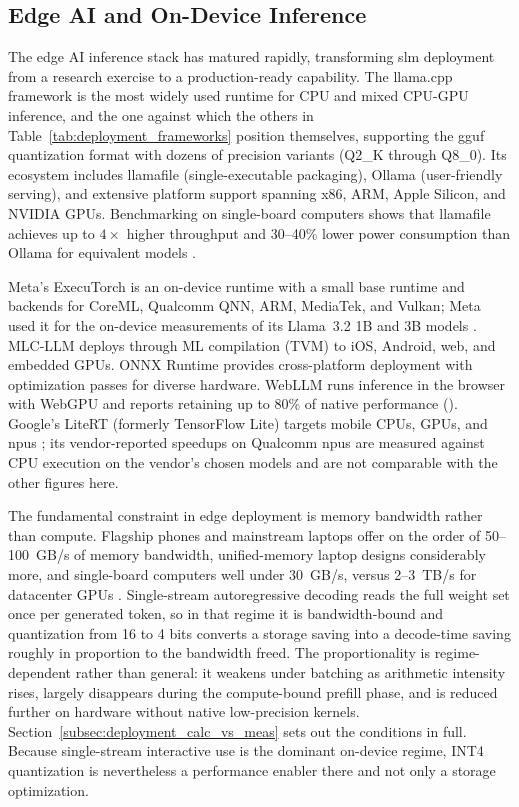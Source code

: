 \subsection{Edge AI and On-Device Inference}
\label{subsec:background_edge_ai}
The edge AI inference stack has matured rapidly, transforming \gls{slm} deployment from a research exercise to a production-ready capability. The llama.cpp framework \citep{gerganov2023llamacpp} is the most widely used runtime for CPU and mixed CPU-GPU inference, and the one against which the others in Table~\ref{tab:deployment_frameworks} position themselves, supporting the \gls{gguf} quantization format with dozens of precision variants (Q2\_K through Q8\_0). Its ecosystem includes llamafile (single-executable packaging), Ollama (user-friendly serving), and extensive platform support spanning x86, ARM, Apple Silicon, and NVIDIA GPUs. Benchmarking on single-board computers shows that llamafile achieves up to $4\times$ higher throughput and 30--40\% lower power consumption than Ollama for equivalent models \citep{nguyen2025sbc}.

Meta's ExecuTorch \citep{meta2024executorch} is an on-device runtime with a small base runtime and backends for CoreML, Qualcomm QNN, ARM, MediaTek, and Vulkan; Meta used it for the on-device measurements of its Llama~3.2 1B and 3B models \citep{meta2024llama32card}. MLC-LLM \citep{mlc2024} deploys through ML compilation (TVM) to iOS, Android, web, and embedded GPUs. ONNX Runtime \citep{microsoft2019onnx} provides cross-platform deployment with optimization passes for diverse hardware. WebLLM \citep{webllm2024} runs inference in the browser with WebGPU and reports retaining up to 80\% of native performance (\evC). Google's LiteRT (formerly TensorFlow Lite) targets mobile CPUs, GPUs, and \glspl{npu} \citep{google2025litert}; its vendor-reported speedups on Qualcomm \glspl{npu} are measured against CPU execution on the vendor's chosen models and are not comparable with the other figures here.

The fundamental constraint in edge deployment is memory bandwidth rather than compute. Flagship phones and mainstream laptops offer on the order of 50--100~GB/s of memory bandwidth, unified-memory laptop designs considerably more, and single-board computers well under 30~GB/s, versus 2--3~TB/s for datacenter GPUs \citep{xu2024device}. Single-stream autoregressive decoding reads the full weight set once per generated token, so in that regime it is bandwidth-bound and quantization from 16 to 4 bits converts a storage saving into a decode-time saving roughly in proportion to the bandwidth freed. The proportionality is regime-dependent rather than general: it weakens under batching as arithmetic intensity rises, largely disappears during the compute-bound prefill phase, and is reduced further on hardware without native low-precision kernels. Section~\ref{subsec:deployment_calc_vs_meas} sets out the conditions in full. Because single-stream interactive use is the dominant on-device regime, INT4 quantization is nevertheless a performance enabler there and not only a storage optimization.


